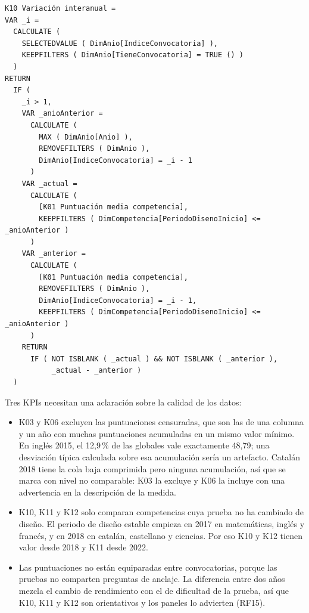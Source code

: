 \documentclass[12pt, a4paper, oneside]{report}
\begin{document}
\par\vspace{2ex}\noindent\begin{minipage}{\textwidth}\footnotesize{}
\begin{verbatim}
K10 Variación interanual =
VAR _i =
  CALCULATE (
    SELECTEDVALUE ( DimAnio[IndiceConvocatoria] ),
    KEEPFILTERS ( DimAnio[TieneConvocatoria] = TRUE () )
  )
RETURN
  IF (
    _i > 1,
    VAR _anioAnterior =
      CALCULATE (
        MAX ( DimAnio[Anio] ),
        REMOVEFILTERS ( DimAnio ),
        DimAnio[IndiceConvocatoria] = _i - 1
      )
    VAR _actual =
      CALCULATE (
        [K01 Puntuación media competencia],
        KEEPFILTERS ( DimCompetencia[PeriodoDisenoInicio] <= _anioAnterior )
      )
    VAR _anterior =
      CALCULATE (
        [K01 Puntuación media competencia],
        REMOVEFILTERS ( DimAnio ),
        DimAnio[IndiceConvocatoria] = _i - 1,
        KEEPFILTERS ( DimCompetencia[PeriodoDisenoInicio] <= _anioAnterior )
      )
    RETURN
      IF ( NOT ISBLANK ( _actual ) && NOT ISBLANK ( _anterior ),
           _actual - _anterior )
  )
\end{verbatim}
\end{minipage}\par\vspace{2.5ex}

Tres KPIs necesitan una aclaración sobre la calidad de los datos:
\begin{itemize}
    \item K03 y K06 excluyen las puntuaciones censuradas, que son las de una columna y un año con muchas puntuaciones acumuladas en un mismo valor mínimo. En inglés 2015, el 12,9\,\% de las globales vale exactamente 48,79; una desviación típica calculada sobre esa acumulación sería un artefacto. Catalán 2018 tiene la cola baja comprimida pero ninguna acumulación, así que se marca con nivel no comparable: K03 la excluye y K06 la incluye con una advertencia en la descripción de la medida.
    \item K10, K11 y K12 solo comparan competencias cuya prueba no ha cambiado de diseño. El periodo de diseño estable empieza en 2017 en matemáticas, inglés y francés, y en 2018 en catalán, castellano y ciencias. Por eso K10 y K12 tienen valor desde 2018 y K11 desde 2022.
    \item Las puntuaciones no están equiparadas entre convocatorias, porque las pruebas no comparten preguntas de anclaje. La diferencia entre dos años mezcla el cambio de rendimiento con el de dificultad de la prueba, así que K10, K11 y K12 son orientativos y los paneles lo advierten (RF15).
\end{itemize}
\end{document}
